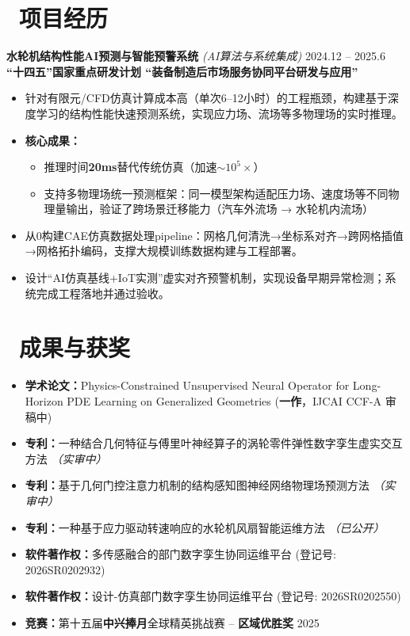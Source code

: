 \documentclass[11pt]{article}
\begin{document}
\section{\makebox[\widthof{\faBriefcase}][c]{\color{CVBlue}%
\faBriefcase}\ 项目经历}

\textbf{水轮机结构性能AI预测与智能预警系统} 
\textit{(AI算法与系统集成)} \hfill 2024.12 -- 2025.6\\[0.2em]
\textcolor{CVBlue}{\textbf{``十四五''国家重点研发计划
``装备制造后市场服务协同平台研发与应用''}}
\begin{itemize}
    \item 针对有限元/CFD仿真计算成本高（单次6–12小时）的工程瓶颈，构建基于深度学习的结构性能快速预测系统，实现应力场、流场等多物理场的实时推理。
    \item \textbf{核心成果：}
    \begin{itemize}
        \item 推理时间\textbf{20ms}替代传统仿真（加速$\sim10^5\times$）
        \item 支持多物理场统一预测框架：同一模型架构适配压力场、速度场等不同物理量输出，验证了跨场景迁移能力（汽车外流场 → 水轮机内流场）
    \end{itemize}
    \item 从0构建CAE仿真数据处理pipeline：网格几何清洗→坐标系对齐→跨网格插值→网格拓扑编码，支撑大规模训练数据构建与工程部署。
    \item 设计“AI仿真基线+IoT实测”虚实对齐预警机制，实现设备早期异常检测；系统完成工程落地并通过验收。
\end{itemize}


\section{%
    \makebox[\widthof{\faTrophy}][c]%
    {\color{CVBlue}\faTrophy}\ 成果与获奖%
}

\begin{itemize}
    \item \textbf{学术论文：}Physics-Constrained Unsupervised Neural Operator for Long-Horizon PDE Learning on Generalized Geometries (\textbf{一作}，IJCAI CCF-A 审稿中)
    \item \textbf{专利：}一种结合几何特征与傅里叶神经算子的涡轮零件弹性数字孪生虚实交互方法 \textit{（实审中）}
    \item \textbf{专利：}基于几何门控注意力机制的结构感知图神经网络物理场预测方法 \textit{（实审中）}
    \item \textbf{专利：}一种基于应力驱动转速响应的水轮机风扇智能运维方法 \textit{（已公开）}
    \item \textbf{软件著作权：}多传感融合的部门数字孪生协同运维平台 (登记号: 2026SR0202932)
    \item \textbf{软件著作权：}设计-仿真部门数字孪生协同运维平台 (登记号: 2026SR0202550)
    \item \textbf{竞赛：}第十五届\textbf{中兴捧月}全球精英挑战赛 -- \textbf{区域优胜奖} \hfill 2025
\end{itemize}
\end{document}
